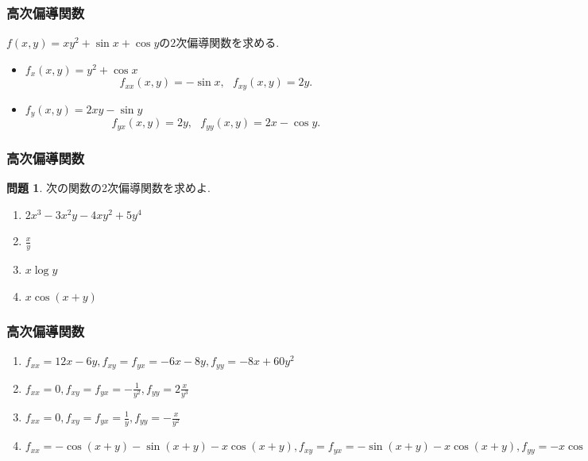 \documentclass[dvipdfmx,cjk,10.2pt]{beamer}
\theoremstyle{definition}
\newtheorem{Prob}[Thm]{問題}
\begin{document}


\begin{frame}
\frametitle{高次偏導関数}

$f(x,y)=xy^2+\sin x + \cos y$の$2$次偏導関数を求める. 

\begin{itemize}
\item $f_x(x,y)=y^2+\cos x$
$$
f_{xx}(x,y)=-\sin x, \ \ \ f_{xy}(x,y)=2y. 
$$
\item $f_y(x,y)=2xy-\sin y$
$$
f_{yx}(x,y)=2y, \ \ \ f_{yy}(x,y)=2x-\cos y. 
$$
\end{itemize}
\end{frame}




\begin{frame}
\frametitle{高次偏導関数}

\begin{Prob}
次の関数の2次偏導関数を求めよ. 
\begin{enumerate}
\item $2x^3-3x^2y-4xy^2+5y^4$
\item $\frac{x}{y}$
\item $x \log y$
\item $x \cos(x+y)$
\end{enumerate}
\end{Prob}

\end{frame}



\begin{frame}
\frametitle{高次偏導関数}


\begin{enumerate}
\item $f_{xx}=12x-6y, f_{xy}=f_{yx}=-6x-8y, f_{yy}=-8x+60y^2$
\item $f_{xx}=0, f_{xy}=f_{yx}=-\frac{1}{y^2}, f_{yy}=2\frac{x}{y^3}$
\item $f_{xx}=0, f_{xy}=f_{yx}=\frac{1}{y}, f_{yy}=-\frac{x}{y^2}$
\item $f_{xx}=-\cos(x+y)-\sin(x+y)-x\cos(x+y), f_{xy}=f_{yx}=-\sin(x+y)-x\cos(x+y), f_{yy}=-x\cos(x+y)$
\end{enumerate}

\end{frame}
\end{document}
